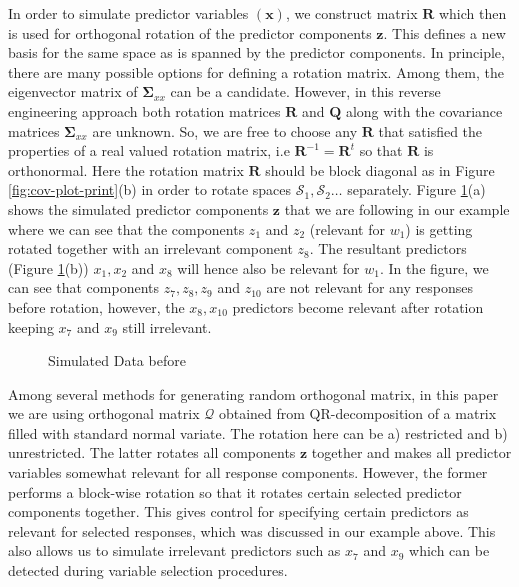 \documentclass[review]{elsarticle}
\theoremstyle{definition}
\theoremstyle{definition}
\theoremstyle{definition}
\theoremstyle{remark}
\begin{document}
In order to simulate predictor variables \((\mathbf{x})\), we construct
matrix \(\mathbf{R}\) which then is used for orthogonal rotation of the
predictor components \(\mathbf{z}\). This defines a new basis for the
same space as is spanned by the predictor components. In principle,
there are many possible options for defining a rotation matrix. Among
them, the eigenvector matrix of \(\boldsymbol{\Sigma}_{xx}\) can be a
candidate. However, in this reverse engineering approach both rotation
matrices \(\mathbf{R}\) and \(\mathbf{Q}\) along with the covariance
matrices \(\boldsymbol{\Sigma}_{xx}\) are unknown. So, we are free to
choose any \(\mathbf{R}\) that satisfied the properties of a real valued
rotation matrix, i.e \(\mathbf{R}^{-1} = \mathbf{R}^t\) so that
\(\mathbf{R}\) is orthonormal. Here the rotation matrix \(\mathbf{R}\)
should be block diagonal as in Figure \ref{fig:cov-plot-print}(b) in
order to rotate spaces \(\mathcal{S}_1, \mathcal{S}_2 \ldots\)
separately. Figure \ref{fig:simulated-data}(a) shows the simulated
predictor components \(\mathbf{z}\) that we are following in our example
where we can see that the components \(z_{1}\) and \(z_{2}\) (relevant
for \(w_1\)) is getting rotated together with an irrelevant component
\(z_{8}\). The resultant predictors (Figure \ref{fig:simulated-data}(b))
\(x_{1}, x_{2}\) and \(x_{8}\) will hence also be relevant for \(w_1\).
In the figure, we can see that components \(z_{7}, z_{8}, z_{9}\) and
\(z_{10}\) are not relevant for any responses before rotation, however,
the \(x_{8}, x_{10}\) predictors become relevant after rotation keeping
\(x_{7}\) and \(x_{9}\) still irrelevant.

\begin{figure}[!htb]

{\centering {}

}

\caption{Simulated Data before}\label{fig:simulated-data}
\end{figure}

Among several methods
\citep{anderson1987generation, heiberger1978algorithm} for generating
random orthogonal matrix, in this paper we are using orthogonal matrix
\(\mathcal{Q}\) obtained from QR-decomposition of a matrix filled with
standard normal variate. The rotation here can be a) restricted and b)
unrestricted. The latter rotates all components \(\mathbf{z}\) together
and makes all predictor variables somewhat relevant for all response
components. However, the former performs a block-wise rotation so that
it rotates certain selected predictor components together. This gives
control for specifying certain predictors as relevant for selected
responses, which was discussed in our example above. This also allows us
to simulate irrelevant predictors such as \(x_{7}\) and \(x_{9}\) which
can be detected during variable selection procedures.
\end{document}
